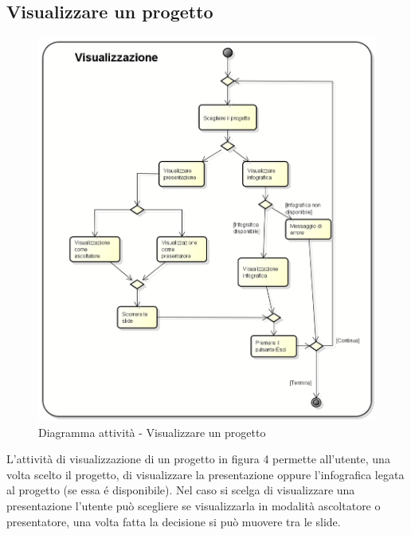 \subsection{Visualizzare un progetto}
\begin{figure}[h] 
	\centering 
	\includegraphics[scale=0.3] {img/Activity_visualizza.png} 
	\caption{Diagramma attività - Visualizzare un progetto} 
\end{figure}
L'attività di visualizzazione di un progetto in figura 4 permette all'utente, una volta scelto il progetto, di visualizzare la presentazione oppure l'\gls{infografica} legata al progetto (se essa é disponibile). Nel caso si scelga di visualizzare una presentazione l'utente può scegliere se visualizzarla in modalità ascoltatore o presentatore, una volta fatta la decisione si può muovere tra le slide.
\newpage


